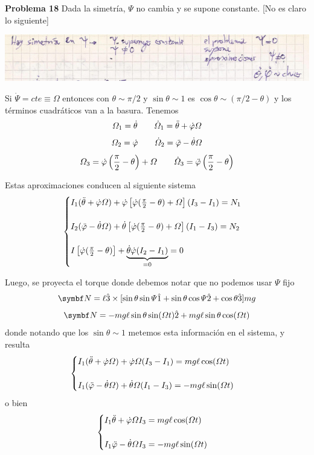 \documentclass[10pt,oneside]{CBFT_book}
\begin{document}
\begin{ejemplo}{\bf Problema 18}
Dada la simetría, $\Psi$ no cambia y se supone constante.
[No es claro lo siguiente]

\includegraphics[scale=0.4]{images/fig_mc_problema_18_duda.jpg}

Si $\dot{\Psi}=cte\equiv \Omega$ entonces con $\theta \sim \pi/2$ y $\sin\theta \sim 1$ es $\cos\theta \sim(\pi/2-\theta)$
y los términos cuadráticos van a la basura. Tenemos
\[
	\Omega_1 = \dot{\theta} \qquad \dot{\Omega}_1 = \ddot{\theta} + \dot{\varphi} \Omega
\]
\[
	\Omega_2 = \dot{\varphi} \qquad \dot{\Omega}_2 = \ddot{\varphi} - \dot{\theta} \Omega
\]
\[
	\Omega_3 = \dot{\varphi}\left( \frac{\pi}{2} - \theta \right) +  \Omega \qquad 
	\dot{\Omega}_3 = \ddot{\varphi}\left( \frac{\pi}{2} - \theta \right)
\]

Estas aproximaciones conducen al siguiente sistema
\[
	\begin{cases}
		I_1 (\ddot{\theta} + \dot{\varphi}\Omega ) + \dot{\varphi} \left[ \dot{\varphi}( \frac{\pi}{2} - \theta ) + \Omega \right] ( I_3 - I_1 ) = N_1 \\
		\\
		I_2 (\ddot{\varphi} - \dot{\theta}\Omega ) + \dot{\theta} \left[ \dot{\varphi}( \frac{\pi}{2} - \theta ) + \Omega \right] ( I_1 - I_3 ) = N_2 \\
		\\
		I \left[ \dot{\varphi}( \frac{\pi}{2} - \theta ) \right] +  \underbrace{\dot{\theta} \dot{\varphi} ( I_2 - I_1 )}_{= 0} = 0\\
	\end{cases}
\]

Luego, se proyecta el torque donde debemos notar que no podemos usar $\Psi$  fijo
\[
	\vb{N} = \ell \hat{3} \times [ \sin\theta \sin\Psi \hat{1} + \sin\theta \cos\Psi \hat{2} + \cos \theta \hat{3} ] m g
\]
\[
	\vb{N} = - m g \ell \sin\theta \sin (\Omega t) \hat{2} + m g \ell \sin\theta \cos (\Omega t)
\]
donde notando que los $\sin\theta \sim 1$ metemos esta información en el sistema, y resulta
\[
	\begin{cases}
	I_1 (\ddot{\theta} + \dot{\varphi}\Omega ) + \dot{\varphi} \Omega ( I_3 - I_1 ) = m g \ell \cos (\Omega t) \\
	\\
	I_1 (\ddot{\varphi} - \dot{\theta} \Omega ) + \dot{\theta} \Omega ( I_1 - I_3 ) = - m g \ell \sin (\Omega t)
	\end{cases}
\]
o bien 
\[
	\begin{cases}
	I_1 \ddot{\theta} + \dot{\varphi} \Omega I_3 = m g \ell \cos (\Omega t) \\
	\\
	I_1 \ddot{\varphi} - \dot{\theta} \Omega I_3 = - m g \ell \sin (\Omega t)
	\end{cases}
\]


\end{ejemplo}
\end{document}

